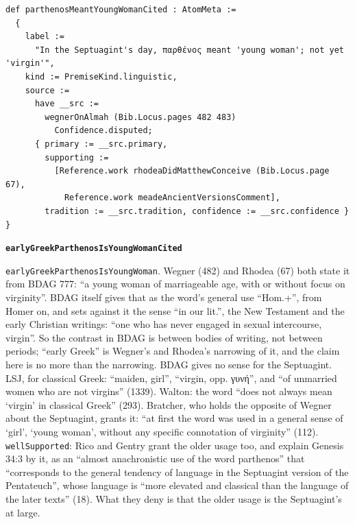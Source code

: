 \documentclass[11pt]{article}
\begin{document}
{\small\begin{verbatim}
def parthenosMeantYoungWomanCited : AtomMeta :=
  {
    label :=
      "In the Septuagint's day, παρθένος meant 'young woman'; not yet 'virgin'",
    kind := PremiseKind.linguistic,
    source :=
      have __src :=
        wegnerOnAlmah (Bib.Locus.pages 482 483)
          Confidence.disputed;
      { primary := __src.primary,
        supporting :=
          [Reference.work rhodeaDidMatthewConceive (Bib.Locus.page 67),
            Reference.work meadeAncientVersionsComment],
        tradition := __src.tradition, confidence := __src.confidence } }
\end{verbatim}}
\par\medskip\noindent\textbf{\texttt{early\allowbreak{}Greek\allowbreak{}Parthenos\allowbreak{}Is\allowbreak{}Young\allowbreak{}Woman\allowbreak{}Cited}}\par\nobreak\noindent
\texttt{early\allowbreak{}Greek\allowbreak{}Parthenos\allowbreak{}Is\allowbreak{}Young\allowbreak{}Woman}. Wegner (482) and Rhodea (67) both state it from BDAG 777: “a young woman of marriageable age, with or without focus on virginity”. BDAG itself gives that as the word’s general use “Hom.+”, from Homer on, and sets against it the sense “in our lit.”, the New Testament and the early Christian writings: “one who has never engaged in sexual intercourse, virgin”. So the contrast in BDAG is between bodies of writing, not between periods; “early Greek” is Wegner’s and Rhodea’s narrowing of it, and the claim here is no more than the narrowing. BDAG gives no sense for the Septuagint. LSJ, for classical Greek: “maiden, girl”, “virgin, opp. γυνή”, and “of unmarried women who are not virgins” (1339). Walton: the word “does not always mean ‘virgin’ in classical Greek” (293). Bratcher, who holds the opposite of Wegner about the Septuagint, grants it: “at first the word was used in a general sense of ‘girl’, ‘young woman’, without any specific connotation of virginity” (112). \texttt{well\allowbreak{}Supported}: Rico and Gentry grant the older usage too, and explain Genesis 34:3 by it, as an “almost anachronistic use of the word parthenos” that “corresponds to the general tendency of language in the Septuagint version of the Pentateuch”, whose language is “more elevated and classical than the language of the later texts” (18). What they deny is that the older usage is the Septuagint’s at large.
\end{document}
